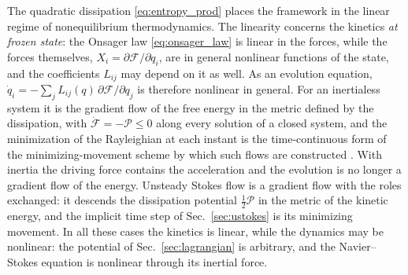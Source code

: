 \documentclass[aip,pof,reprint,amsmath,amssymb,longbibliography]{revtex4-2}
\begin{document}
The quadratic dissipation \eqref{eq:entropy_prod} places the framework in the linear regime of nonequilibrium thermodynamics. The linearity concerns the kinetics \textit{at frozen state}: the Onsager law \eqref{eq:onsager_law} is linear in the forces, while the forces themselves, $X_i = \partial\mathcal{F}/\partial q_i$, are in general nonlinear functions of the state, and the coefficients $L_{ij}$ may depend on it as well. As an evolution equation, $\dot{q}_i = -\sum_j L_{ij}(q)\,\partial\mathcal{F}/\partial q_j$ is therefore nonlinear in general. For an inertialess system it is the gradient flow of the free energy in the metric defined by the dissipation, with $\dot{\mathcal{F}} = -\mathcal{P} \leq 0$ along every solution of a closed system, and the minimization of the Rayleighian at each instant is the time-continuous form of the minimizing-movement scheme by which such flows are constructed \cite{jordan1998, otto2001}. With inertia the driving force contains the acceleration and the evolution is no longer a gradient flow of the energy. Unsteady Stokes flow is a gradient flow with the roles exchanged: it descends the dissipation potential $\tfrac{1}{2}\mathcal{P}$ in the metric of the kinetic energy, and the implicit time step of Sec.~\ref{sec:ustokes} is its minimizing movement. In all these cases the kinetics is linear, while the dynamics may be nonlinear: the potential of Sec.~\ref{sec:lagrangian} is arbitrary, and the Navier--Stokes equation is nonlinear through its inertial force.
\end{document}
